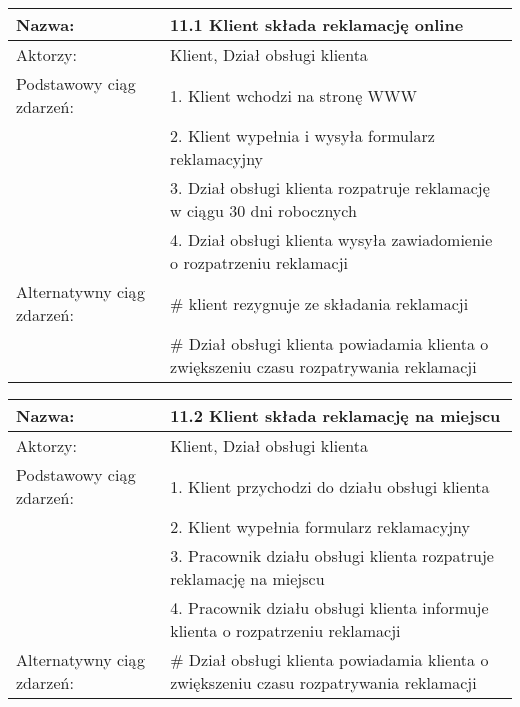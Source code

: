 \begin{center}
\vspace{1cm}

\begin{tabular}{|L{3cm}  L{13cm}|}
\hline
Nazwa: & 11.1 Klient składa reklamację online\\ \hline
Aktorzy: & Klient, Dział obsługi klienta \\ \hline
Podstawowy ciąg zdarzeń: & 1. Klient wchodzi na stronę WWW \\
 & 2. Klient wypełnia i wysyła formularz reklamacyjny \\
 & 3. Dział obsługi klienta rozpatruje reklamację w ciągu 30 dni robocznych\\
 & 4. Dział obsługi klienta wysyła zawiadomienie o rozpatrzeniu reklamacji \\
 \hline
Alternatywny ciąg zdarzeń:  & \# klient rezygnuje ze składania reklamacji \\
 & \# Dział obsługi klienta powiadamia klienta o zwiększeniu czasu rozpatrywania reklamacji \\ 
 \hline
\end{tabular}

\vspace{1cm}

\begin{tabular}{|L{3cm}  L{13cm}|}
\hline
Nazwa: & 11.2 Klient składa reklamację na miejscu\\ \hline
Aktorzy: & Klient, Dział obsługi klienta \\ \hline
Podstawowy ciąg zdarzeń: & 1. Klient przychodzi do działu obsługi klienta \\
 & 2. Klient wypełnia formularz reklamacyjny \\
 & 3. Pracownik działu obsługi klienta rozpatruje reklamację na miejscu \\
 & 4. Pracownik działu obsługi klienta informuje klienta o rozpatrzeniu reklamacji \\
 \hline
Alternatywny ciąg zdarzeń:  & \# Dział obsługi klienta powiadamia klienta o zwiększeniu czasu rozpatrywania reklamacji \\ 
 \hline
\end{tabular}

\vspace{1cm}


\end{center}
